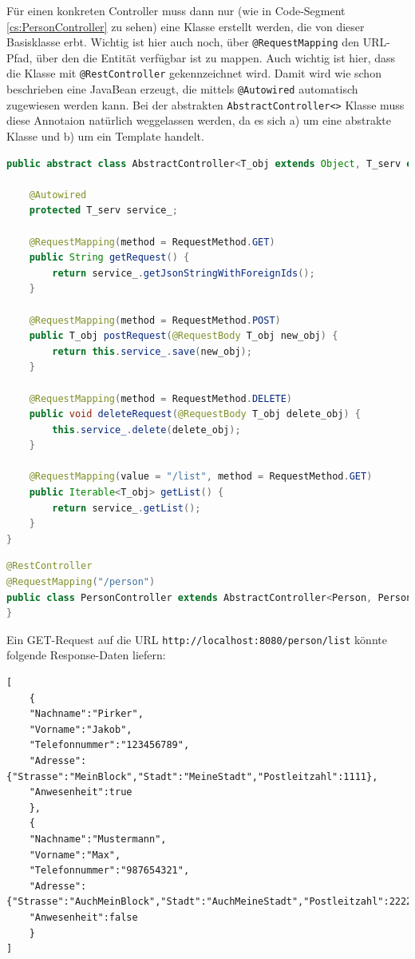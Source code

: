Für einen konkreten Controller muss dann nur (wie in Code-Segment \ref{cs:PersonController} zu sehen) eine Klasse erstellt werden, die von dieser Basisklasse erbt. Wichtig ist hier auch noch, über \verb|@RequestMapping|  den URL-Pfad, über den die Entität verfügbar ist zu mappen. Auch wichtig ist hier, dass die Klasse mit \verb|@RestController| gekennzeichnet wird. Damit wird wie schon beschrieben eine JavaBean erzeugt, die mittels \verb|@Autowired| automatisch zugewiesen werden kann. Bei der abstrakten \verb|AbstractController<>| Klasse muss diese Annotaion natürlich weggelassen werden, da es sich a) um eine abstrakte Klasse und b) um ein Template handelt.

\scriptsize
\begin{lstlisting}[caption=AbstractController.java, label=cs:AbstractController, language=Java]
public abstract class AbstractController<T_obj extends Object, T_serv extends AbstractServiceInterface<T_obj>> {

	@Autowired
	protected T_serv service_;
	
	@RequestMapping(method = RequestMethod.GET)
	public String getRequest() {
		return service_.getJsonStringWithForeignIds();
	}
	
	@RequestMapping(method = RequestMethod.POST)
	public T_obj postRequest(@RequestBody T_obj new_obj) {
		return this.service_.save(new_obj);
	}
	
	@RequestMapping(method = RequestMethod.DELETE)
	public void deleteRequest(@RequestBody T_obj delete_obj) {
		this.service_.delete(delete_obj);
	}
	
	@RequestMapping(value = "/list", method = RequestMethod.GET)
	public Iterable<T_obj> getList() {
		return service_.getList();
	}
}
\end{lstlisting}

\begin{lstlisting}[caption=PersonController.java, label=cs:PersonController, language=Java]
@RestController
@RequestMapping("/person")
public class PersonController extends AbstractController<Person, PersonService>{
}
\end{lstlisting}
\normalsize

Ein GET-Request auf die URL \verb|http://localhost:8080/person/list| könnte folgende Response-Daten liefern:

\scriptsize
\begin{lstlisting}
[
	{	
	"Nachname":"Pirker",
	"Vorname":"Jakob",
	"Telefonnummer":"123456789",
	"Adresse":{"Strasse":"MeinBlock","Stadt":"MeineStadt","Postleitzahl":1111},
	"Anwesenheit":true
	},
	{	
	"Nachname":"Mustermann",
	"Vorname":"Max",
	"Telefonnummer":"987654321",
	"Adresse":{"Strasse":"AuchMeinBlock","Stadt":"AuchMeineStadt","Postleitzahl":2222},
	"Anwesenheit":false
	}
]
\end{lstlisting}
\normalsize

